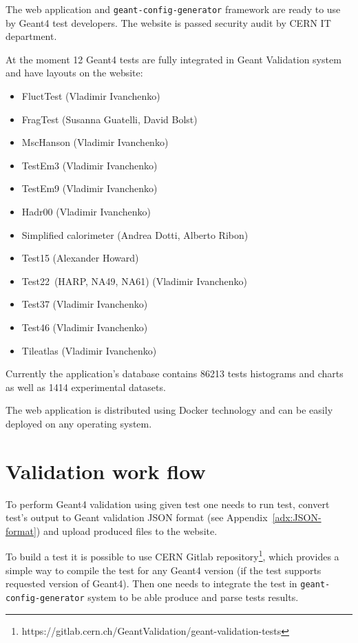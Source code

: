 The web application and {\tt geant-config-generator} framework are ready to use by Geant4 test developers. The website is passed security audit by CERN IT department.

At the moment 12 Geant4 tests are fully integrated in Geant Validation system and have layouts on the website:
\begin{itemize}
    \item FluctTest (Vladimir Ivanchenko)
    \item FragTest (Susanna Guatelli, David Bolst)
    \item MscHanson (Vladimir Ivanchenko)
    \item TestEm3 (Vladimir Ivanchenko)
    \item TestEm9 (Vladimir Ivanchenko)
    \item Hadr00 (Vladimir Ivanchenko)
    \item Simplified calorimeter (Andrea Dotti, Alberto Ribon)
    \item Test15 (Alexander Howard)
    \item Test22~(HARP, NA49, NA61) (Vladimir Ivanchenko)
    \item Test37 (Vladimir Ivanchenko)
    \item Test46 (Vladimir Ivanchenko)
    \item Tileatlas (Vladimir Ivanchenko)
\end{itemize}

Currently the application's database contains 86213 tests histograms and charts as well as 1414 experimental datasets.

The web application is distributed using Docker technology and can be easily deployed on any operating system.

\section{Validation work flow}
\label{sec-workflow}

To perform Geant4 validation using given test one needs to run test, convert test's output to Geant validation JSON format (see Appendix~\ref{adx:JSON-format}) and upload produced files to the website.

To build a test it is possible to use CERN Gitlab repository\footnote{https://gitlab.cern.ch/GeantValidation/geant-validation-tests}, which provides a simple way to compile the test for any Geant4 version (if the test supports requested version of Geant4).
Then one needs to integrate the test in {\tt geant-config-generator} system to be able produce and parse tests results.

